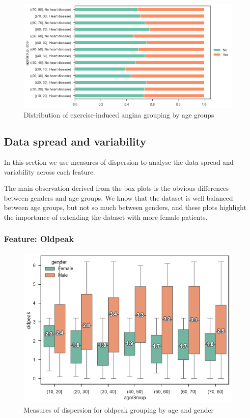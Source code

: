 \begin{figure}[H]
    \caption{Distribution of exercise-induced angina grouping by age groups}\label{frequency-exerciseangina-agegroup-percent}
    \centering
    \includegraphics[width=\linewidth]{media/frequency-12-agegroup-exerciseangina.png}
\end{figure}

\subsection{Data spread and variability}

In this section we use measures of dispersion to analyse the data spread and variability across each feature.

The main observation derived from the box plots is the obvious differences between genders and age groups. We know that
the dataset is well balanced between age groups, but not so much between genders, and these plots highlight the
importance of extending the dataset with more female patients.

\subsubsection{Feature: Oldpeak}

\begin{figure}[H]
    \caption{Measures of dispersion for oldpeak grouping by age and gender}\label{boxplot-oldpeak-age}
    \centering
    \includegraphics[width=\linewidth]{media/boxplot-01-agegroup-gender-oldpeak.png}
\end{figure}

